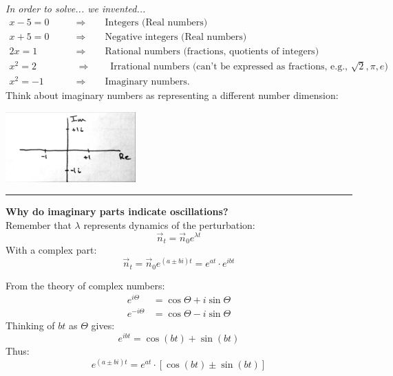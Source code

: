 \documentclass{article}
\begin{document}
\emph{In order to solve... we invented...}
\begin{align*}
	x-5 = 0 \qquad &\Rightarrow \qquad \text{Integers (Real numbers)}\\
	x+5 = 0 \qquad &\Rightarrow \qquad \text{Negative integers (Real numbers)}\\
	2x = 1 \qquad &\Rightarrow \qquad \text{Rational numbers (fractions, quotients of integers)}\\
	x^2 = 2 \qquad &\Rightarrow \qquad \text{Irrational numbers (can't be expressed as fractions, e.g., }\sqrt{2}, \pi, e)\\
	x^2= -1 \qquad &\Rightarrow \qquad \text{Imaginary numbers.}
\end{align*}
Think about imaginary numbers as representing a different number dimension:
 \begin{center}
 	\includegraphics[width=5cm]{figs/Imag.pdf}
 \end{center}
 
\rule[0.5ex]{\linewidth}{1pt}

\textbf{Why do imaginary parts indicate oscillations?}\\
Remember that $\lambda$ represents dynamics of the perturbation:
\begin{equation*}
	\vec{n}_t = \vec{n}_0 e^{\lambda t}
\end{equation*}
With a complex part:
\begin{equation*}
	\vec{n}_t = \vec{n}_0 e^{(a \pm bi) t} = e^{at} \cdot e^{i bt}
\end{equation*}

From the theory of complex numbers:
\begin{align*}
	e^{i \Theta} &= \cos \Theta + i \sin \Theta \\ 
	e^{-i \Theta} &= \cos \Theta - i \sin \Theta
\end{align*}
Thinking  of $bt$ as $\Theta$ gives:
\begin{equation*}
	e^{i bt} = \cos (bt) + \sin (bt)
\end{equation*} 
Thus:
\begin{equation*}
	e^{(a \pm bi) t} =  e^{at} \cdot  [\cos (bt) \pm \sin (bt)]
\end{equation*} 
\end{document}
